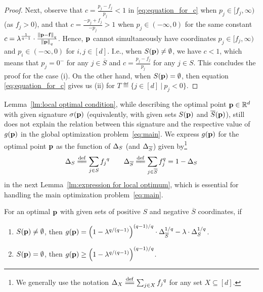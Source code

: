 \begin{proof}
Next, observe that $c = \frac{p_j-f_j}{p_j}<1$ in \eqref{eq:equation_for_c} when $p_j\in [f_j,\infty)$ (as $f_j>0$), and that $c=\frac{-p_j+f_j}{-p_j}>1$ when $p_j\in (-\infty, 0)$ for the same 
constant $c=\lambda^\frac{1}{q-1}\cdot\frac{\qnorm{\loc-\facility}}{\qnorm{\loc}}$. Hence, $\loc$ cannot 
simultaneously have coordinates $p_j\in[f_j,\infty)$ and $p_i\in(-\infty,0)$ for $i,j\in[d]$. I.e., when $S(\loc)\ne\emptyset$, we have $c<1$, which means that $p_j=0^-$ for any $j\in\overline{S}$ and $c=\frac{p_j-f_j}{p_j}$ for any $j\in S$. This concludes the proof for the 
case (i). On the other hand, when $S(\loc)=\emptyset$, then equation \eqref{eq:equation_for_c} gives us (ii) for $T\eqdef\{j\in [d] ~|~p_j < 0\}$.
\end{proof}

Lemma~\ref{lm:local optimal condition}, while describing the optimal point $\loc\in\reals^d$ with given signature $\sigma(\loc)$ (equivalently, with given sets $S(\loc)$ and $\overline{S}(\loc)$), still does not explain the relation between this signature and the respective value of $g(\loc)$ in the global optimization problem~\eqref{eq:main}. We express $g(\loc)$ for the optimal point $\loc$ as the function of $\energy[S]$ (and $\energyc[S]$) given by\footnote{We generally use the notation $\energy[X]\eqdef\sum_{j\in X}{f_j}^q$ for any set $X\subseteq[d]$.} 
\[
\energy[S]\eqdef\sum_{j\in S}{f_j}^q\quad\quad
\energyc[S] \eqdef\sum_{j\in \overline{S}}f_j^q=1-\energy[S]
\]
in the next Lemma~\ref{lm:expression for local optimum}, which is essential for handling the main optimization problem~\eqref{eq:main}.  
\begin{lemma}
    \label{lm:expression for local optimum}
    For an optimal $\loc$ with 
    given sets of positive $S$ and negative $\overline{S}$ coordinates, if 
    \begin{enumerate}[label=(\roman*)]
        \item $S(\loc)\ne\emptyset$, then 
        $g(\loc)=\Big(1-\lambda^{q/(q-1)}\Big)^{(q-1)/q}\cdot\ecsq-\lambda\cdot\esq$.
        \item $S(\loc)=\emptyset$, then 
        $g(\loc)\geq\Big(1-\lambda^{q/(q-1)}\Big)^{(q-1)/q}$.
    \end{enumerate}
\end{lemma}

